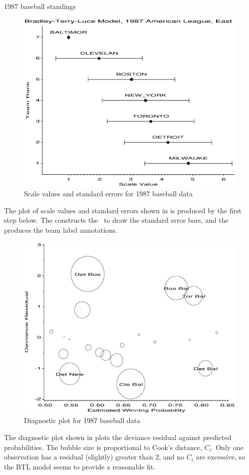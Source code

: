 \begin{Example}[winloss]{1987 baseball standings}
\begin{figure}[!htb]
  \centering
  \includegraphics[scale=.6]{ch6/fig/btl21}
  \caption{Scale values and standard errors for 1987 baseball data}%
  \label{fig:btl21}
\end{figure}
The plot of scale values and standard errors shown in 
is produced by the first  step below.
The  constructs the \ADS\ to draw the standard error bars,
and the  produces the team label annotations.


\begin{figure}[htb]
  \centering
  \includegraphics[scale=.6]{ch6/fig/btl22}
  \caption{Diagnostic plot for 1987 baseball data}%
  \label{fig:btl22}
\end{figure}
The diagnostic plot shown in  plots the deviance residual
against predicted probabilities.  The bubble size is proportional to Cook's
distance, $C_i$.  Only one observation has a residual (slightly) greater than 2,
and no $C_i$ are excessive, so the BTL model seems to provide a reasonable
fit.
\end{Example}
